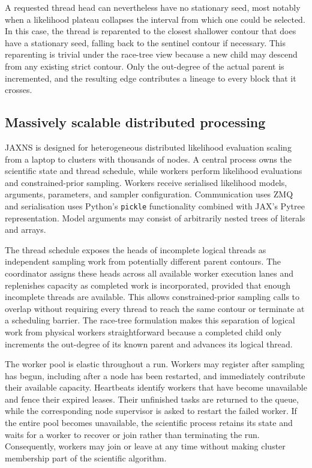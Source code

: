 \documentclass[pdflatex,sn-basic,icol]{sn-jnl}
\theoremstyle{plain}
\theoremstyle{definition}
\begin{document}
A requested thread head can nevertheless have no stationary seed, most notably when a likelihood plateau collapses the interval from which one could be selected.
In this case, the thread is reparented to the closest shallower contour that does have a stationary seed, falling back to the sentinel contour if necessary.
This reparenting is trivial under the race-tree view because a new child may descend from any existing strict contour.
Only the out-degree of the actual parent is incremented, and the resulting edge contributes a lineage to every block that it crosses.

\subsection{Massively scalable distributed processing}

JAXNS is designed for heterogeneous distributed likelihood evaluation scaling from a laptop to clusters with thousands of nodes.
A central process owns the scientific state and thread schedule, while workers perform likelihood evaluations and constrained-prior sampling.
Workers receive serialised likelihood models, arguments, parameters, and sampler configuration.
Communication uses ZMQ and serialisation uses Python's \texttt{pickle} functionality combined with JAX's Pytree representation.
Model arguments may consist of arbitrarily nested trees of literals and arrays.

The thread schedule exposes the heads of incomplete logical threads as independent sampling work from potentially different parent contours.
The coordinator assigns these heads across all available worker execution lanes and replenishes capacity as completed work is incorporated, provided that enough incomplete threads are available.
This allows constrained-prior sampling calls to overlap without requiring every thread to reach the same contour or terminate at a scheduling barrier.
The race-tree formulation makes this separation of logical work from physical workers straightforward because a completed child only increments the out-degree of its known parent and advances its logical thread.

The worker pool is elastic throughout a run.
Workers may register after sampling has begun, including after a node has been restarted, and immediately contribute their available capacity.
Heartbeats identify workers that have become unavailable and fence their expired leases.
Their unfinished tasks are returned to the queue, while the corresponding node supervisor is asked to restart the failed worker.
If the entire pool becomes unavailable, the scientific process retains its state and waits for a worker to recover or join rather than terminating the run.
Consequently, workers may join or leave at any time without making cluster membership part of the scientific algorithm.
\end{document}
